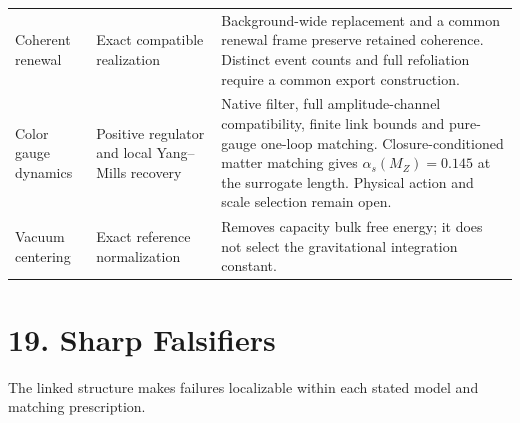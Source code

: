 \documentclass[11pt]{article}
\begin{document}
\begin{longtable}{L{0.24\textwidth}L{0.22\textwidth}L{0.47\textwidth}}
Coherent renewal & Exact compatible realization & Background-wide replacement and a common renewal frame preserve retained coherence. Distinct event counts and full refoliation require a common export construction.\\
Color gauge dynamics & Positive regulator and local Yang--Mills recovery & Native filter, full amplitude-channel compatibility, finite link bounds and pure-gauge one-loop matching. Closure-conditioned matter matching gives $\alpha_s(M_Z)=0.145$ at the surrogate length. Physical action and scale selection remain open.\\
Vacuum centering & Exact reference normalization & Removes capacity bulk free energy; it does not select the gravitational integration constant.\\
\end{longtable}
\endgroup

\section{19. Sharp Falsifiers}

The linked structure makes failures localizable within each stated model and matching prescription.
\end{document}
